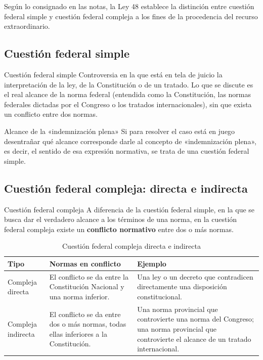 \documentclass[12pt,oneside]{book}
\begin{document}
Según lo consignado en las notas, la Ley 48 establece la distinción entre cuestión federal simple y cuestión federal compleja a los fines de la procedencia del recurso extraordinario.

\subsection{Cuestión federal simple}

\begin{definition}{Cuestión federal simple}
Controversia en la que está en tela de juicio la interpretación de la ley, de la Constitución o de un tratado. Lo que se discute es el real alcance de la norma federal (entendida como la Constitución, las normas federales dictadas por el Congreso o los tratados internacionales), sin que exista un conflicto entre dos normas.
\end{definition}

\begin{example}{Alcance de la «indemnización plena»}
Si para resolver el caso está en juego desentrañar qué alcance corresponde darle al concepto de «indemnización plena», es decir, el sentido de esa expresión normativa, se trata de una cuestión federal simple.
\end{example}

\subsection{Cuestión federal compleja: directa e indirecta}

\begin{definition}{Cuestión federal compleja}
A diferencia de la cuestión federal simple, en la que se busca dar el verdadero alcance a los términos de una norma, en la cuestión federal compleja existe un \textbf{conflicto normativo} entre dos o más normas.
\end{definition}

\begin{table}[H]
\centering
\begin{tabularx}{\textwidth}{@{}>{\raggedright\arraybackslash}p{}>{\raggedright\arraybackslash}X>{\raggedright\arraybackslash}X@{}}
\toprule
\textbf{Tipo} & \textbf{Normas en conflicto} & \textbf{Ejemplo} \\
\midrule
Compleja directa &
El conflicto se da entre la Constitución Nacional y una norma inferior. &
Una ley o un decreto que contradicen directamente una disposición constitucional. \\
\addlinespace[0.4em]
Compleja indirecta &
El conflicto se da entre dos o más normas, todas ellas inferiores a la Constitución. &
Una norma provincial que controvierte una norma del Congreso; una norma provincial que controvierte el alcance de un tratado internacional. \\
\bottomrule
\end{tabularx}
\caption{Cuestión federal compleja directa e indirecta}
\end{table}
\end{document}
